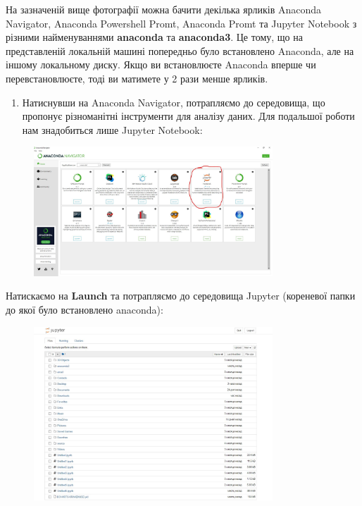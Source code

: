 \documentclass[
  letterpaper,
]{report}
\providecommand{\tightlist}{%
  \setlength{\itemsep}{0pt}\setlength{\parskip}{0pt}}\usepackage{longtable,booktabs,array}
\begin{document}
На зазначеній вище фотографії можна бачити декілька ярликів Anaconda
Navigator, Anaconda Powershell Promt, Anaconda Promt та Jupyter Notebook
з різними найменуваннями \textbf{anaconda} та \textbf{anaconda3}. Це
тому, що на представленій локальній машині попередньо було встановлено
Anaconda, але на іншому локальному диску. Якщо ви встановлюєте Anaconda
вперше чи перевстановлюєте, тоді ви матимете у 2 рази менше ярликів.

\begin{enumerate}
\def\labelenumi{\arabic{enumi}.}
\setcounter{enumi}{13}
\tightlist
\item
  Натиснувши на Anaconda Navigator, потрапляємо до середовища, що
  пропонує різноманітні інструменти для аналізу даних. Для подальшої
  роботи нам знадобиться лише Jupyter Notebook:
\end{enumerate}

\begin{figure}

{\centering \includegraphics[width=0.8\textwidth,height=\textheight]{Images/ap1/Screenshot_15.jpg}

}

\end{figure}

Натискаємо на \textbf{Launch} та потрапляємо до середовища Jupyter
(кореневої папки до якої було встановлено anaconda):

\begin{figure}

{\centering \includegraphics[width=0.8\textwidth,height=\textheight]{Images/ap1/Screenshot_16.jpg}

}

\end{figure}
\end{document}
